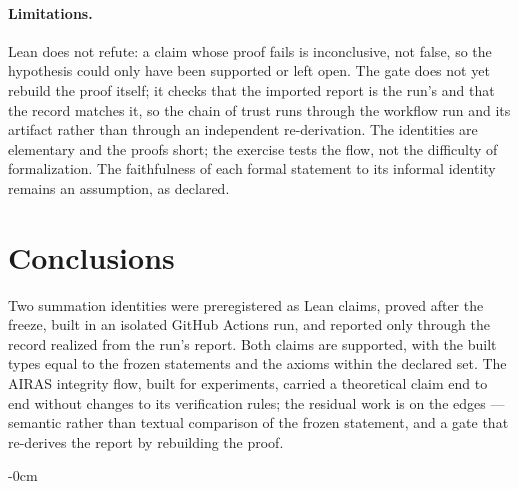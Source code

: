 \documentclass[journal,article,submit,pdftex,moreauthors]{Definitions/mdpi}
\begin{document}
\paragraph{Limitations.} Lean does not refute: a claim whose proof fails is inconclusive, not false, so the hypothesis could only have been supported or left open. The gate does not yet rebuild the proof itself; it checks that the imported report is the run's and that the record matches it, so the chain of trust runs through the workflow run and its artifact rather than through an independent re-derivation. The identities are elementary and the proofs short; the exercise tests the flow, not the difficulty of formalization. The faithfulness of each formal statement to its informal identity remains an assumption, as declared.

\section{Conclusions}

Two summation identities were preregistered as Lean claims, proved after the freeze, built in an isolated GitHub Actions run, and reported only through the record realized from the run's report. Both claims are supported, with the built types equal to the frozen statements and the axioms within the declared set. The AIRAS integrity flow, built for experiments, carried a theoretical claim end to end without changes to its verification rules; the residual work is on the edges --- semantic rather than textual comparison of the frozen statement, and a gate that re-derives the report by rebuilding the proof.


\vspace{6pt}


\begin{adjustwidth}{-\extralength}{0cm}


\PublishersNote{}
\end{adjustwidth}
\end{document}
